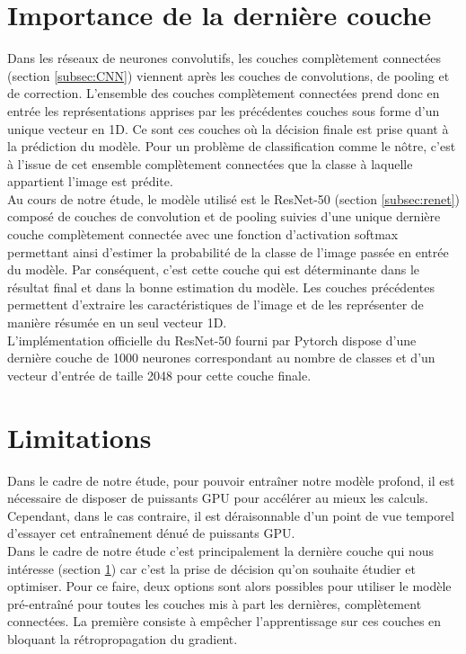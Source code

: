 \documentclass[12pt,english, openany]{book}
\begin{document}
\section{Importance de la dernière couche}
\label{sec:lastlayer}

Dans les réseaux de neurones convolutifs, les couches complètement connectées (section \ref{subsec:CNN}) viennent après les couches de convolutions, de pooling et de correction. L'ensemble des couches complètement connectées prend donc en entrée les représentations apprises par les précédentes couches sous forme d'un unique vecteur en 1D. Ce sont ces couches où la décision finale est prise quant à la prédiction du modèle. Pour un problème de classification comme le nôtre, c'est à l’issue de cet ensemble complètement connectées que la classe à laquelle appartient l'image est prédite.\\

Au cours de notre étude, le modèle utilisé est le ResNet-50 (section \ref{subsec:renet}) composé de couches de convolution et de pooling suivies d'une unique dernière couche complètement connectée avec une fonction d'activation softmax permettant ainsi d'estimer la probabilité de la classe de l'image passée en entrée du modèle. Par conséquent, c'est cette couche qui est déterminante dans le résultat final et dans la bonne estimation du modèle. Les couches précédentes permettent d'extraire les caractéristiques de l'image et de les représenter de manière résumée en un seul vecteur 1D.\\

L'implémentation officielle du ResNet-50 fourni par Pytorch dispose d'une dernière couche de 1000 neurones correspondant au nombre de classes et d'un vecteur d'entrée de taille 2048 pour cette couche finale.

\section{Limitations}
\label{sec:limitations}
Dans le cadre de notre étude, pour pouvoir entraîner notre modèle profond, il est nécessaire de disposer de puissants GPU pour accélérer au mieux les calculs. Cependant, dans le cas contraire, il est déraisonnable d'un point de vue temporel d'essayer cet entraînement dénué de puissants GPU.\\

Dans le cadre de notre étude c'est principalement la dernière couche qui nous intéresse (section \ref{sec:lastlayer}) car c'est la prise de décision qu'on souhaite étudier et optimiser. Pour ce faire, deux options sont alors possibles pour utiliser le modèle pré-entraîné pour toutes les couches mis à part les dernières, complètement connectées. La première consiste à empêcher l'apprentissage sur ces couches en bloquant la rétropropagation du gradient.\\
\end{document}
